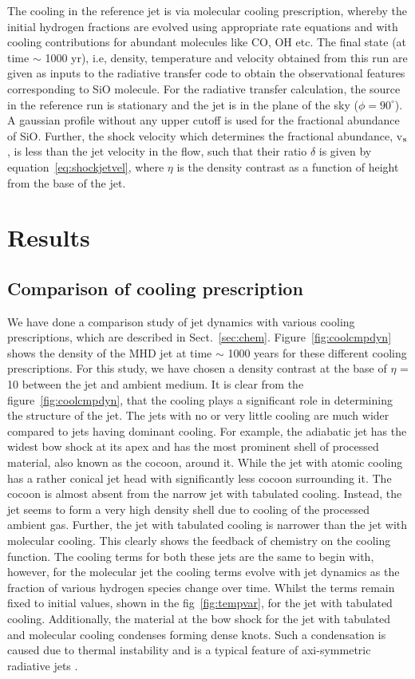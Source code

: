 \documentclass[useAMS,usenatbib]{mn2e}
\begin{document}
The cooling in the reference jet is via molecular cooling prescription, whereby
the initial hydrogen fractions are evolved using appropriate rate equations and with cooling 
contributions for abundant molecules like CO, OH
etc. The final state (at time $\sim$ 1000 yr), i.e, density, temperature and velocity obtained from this 
run are given as inputs to the radiative transfer code to obtain the observational features
corresponding to SiO molecule. 
For the radiative transfer calculation, the source in the reference
run is stationary and the jet is in the plane of the sky ($\phi =
90^{\circ}$). A gaussian profile without any upper cutoff is used for the fractional abundance
of SiO. Further, the shock velocity which determines
the fractional abundance, v$_{\rm s}$, is less than the jet velocity in the
flow, such that their ratio $\delta$ is given by
equation~\ref{eq:shockjetvel}, where $\eta$ is the density contrast as a
function of height from the base of the jet.

\section{Results}
\label{sec:results}
\subsection{Comparison of cooling prescription}
\label{ssec:coolres}
We have done a comparison study of jet dynamics with various cooling
prescriptions, which are described in
Sect.~\ref{sec:chem}. Figure~\ref{fig:coolcmpdyn} shows the density of the MHD
jet at time $\sim$ 1000 years for these different cooling
prescriptions. For this study, we have chosen a density contrast at the base of
$\eta$ = 10 between the jet and ambient medium.
It is clear from the figure~\ref{fig:coolcmpdyn}, that the cooling plays a
significant role in determining the structure of the jet. The jets
with no or very little cooling are much wider compared to
jets having dominant cooling. For example, the adiabatic jet
has the widest bow shock at its apex and has the most prominent shell
of processed material, also known as the cocoon,
around it. While the jet with atomic cooling has a rather conical
jet head with significantly less cocoon surrounding it. The cocoon is
almost absent from the narrow jet with tabulated cooling. Instead, the jet
seems to form a very high density shell due to cooling of the
processed ambient gas. Further, the jet with tabulated cooling is narrower than the jet with molecular cooling. This clearly
shows the feedback of chemistry on the cooling function. The cooling
terms for both these jets are the same to begin with, however,
for the molecular jet the cooling terms evolve with jet dynamics as the fraction of
various hydrogen species change over time. Whilst the terms remain fixed to initial values, shown in the fig~\ref{fig:tempvar}, for the jet with tabulated
cooling. Additionally, the material at the bow shock for the jet
with tabulated and molecular cooling condenses forming dense knots. 
Such a condensation is caused due to thermal instability and is 
a typical feature of axi-symmetric radiative jets 
\citep[see, for e.g,][]{Blondin:1990p2130,Cerqueira:1999p15052}.
%
\end{document}
